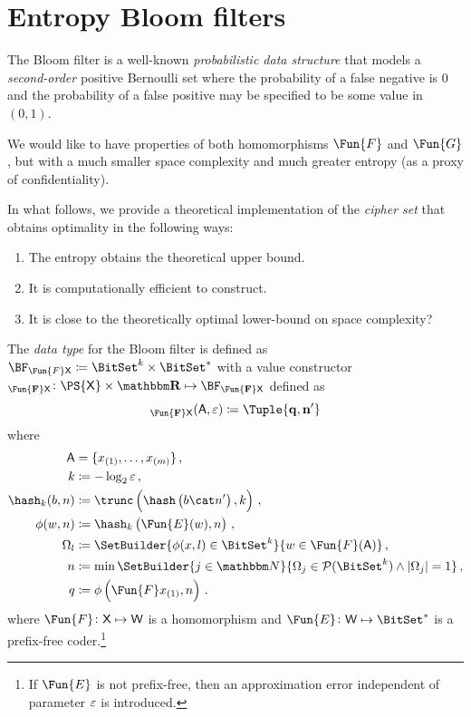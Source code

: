 \documentclass[ ../main.tex]{subfiles}
\begin{document}
\section{Entropy Bloom filters}
\label{sec:bf}
The Bloom filter is a well-known \emph{probabilistic data structure} that models a \emph{second-order} positive Bernoulli set where the probability of a false negative is $0$ and the probability of a false positive may be specified to be some value in $(0,1)$.

We would like to have properties of both homomorphisms $\Fun{F}$ and $\Fun{G}$, but with a much smaller space complexity and much greater entropy (as a proxy of confidentiality).

In what follows, we provide a theoretical implementation of the \emph{cipher set} that obtains optimality in the following ways:
\begin{enumerate}
	\item The entropy obtains the theoretical upper bound.
    \item It is computationally efficient to construct.
    \item It is close to the theoretically optimal lower-bound on space complexity?
\end{enumerate}

\begin{definition}
\label{alg:makeset}
	The \emph{data type} for the Bloom filter is defined as $\BF_{\Fun{F} \Set{X}} \coloneqq \BitSet^k \times \BitSet^*$ with a value constructor $\bf_{\Fun{F}\Set{X}} \colon \PS{\Set{X}} \times \RealSet \mapsto \BF_{\Fun{F} \Set{X}}$ defined as
	\begin{equation}
	\bf_{\Fun{F} \Set{X}}(\Set{A}, \fprate) \coloneqq \Tuple{q,n'}
	\end{equation}
	where
	\begin{equation}
	\begin{split}
	\Set{A}     & = \{x_{(1)},\ldots,x_{(m)}\}\,,\\
	k			& \coloneqq -\log_2 \fprate\,,\\
	\hash_k(b,n)& \coloneqq \trunc\left(\hash\left(b \cat n'\right),k\right)\,,\\	
	\phi(w,n) 	& \coloneqq \hash_k\left(\Fun{E}(w), n\right)\,,\\
	\Omega_l 	& \coloneqq \SetBuilder{\phi(x,l) \in \BitSet^k}{w \in \Fun{F}(\Set{A})}\,,\\
	n 			& \coloneqq \min\SetBuilder{ j \in \NatSet }{ \Omega_j \in \PowerSet(\BitSet^k) \land \Card{\Omega_j} = 1}\,,\\
	q 			& \coloneqq \phi\left(\Fun{F} x_{(1)},n\right)\,.
	\end{split}
	\end{equation}
where $\Fun{F} \colon \Set{X} \mapsto \Set{W}$ is a homomorphism and $\Fun{E} \colon \Set{W} \mapsto \BitSet^*$ is a prefix-free coder.\footnote{If $\Fun{E}$ is not prefix-free, then an approximation error independent of parameter $\varepsilon$ is introduced.}
\end{definition}
\end{document}
